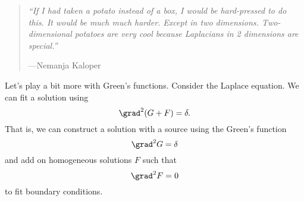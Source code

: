 \begin{quote}
    \textit{``If I had taken a potato instead of a box, I would be hard-pressed to do this. It would be much much harder. Except in two dimensions. Two-dimensional potatoes are very cool because Laplacians in 2 dimensions are special.''}
    
    ---Nemanja Kaloper
\end{quote}

Let's play a bit more with Green's functions. Consider the Laplace equation. We can fit a solution using
\begin{equation}
    \grad^2(G+F) = \delta.
\end{equation}
That is, we can construct a solution with a source using the Green's function
\begin{equation}
    \grad^2 G = \delta
\end{equation}
and add on homogeneous solutions $F$ such that
\begin{equation}
    \grad^2 F =0
\end{equation}
to fit boundary conditions.

